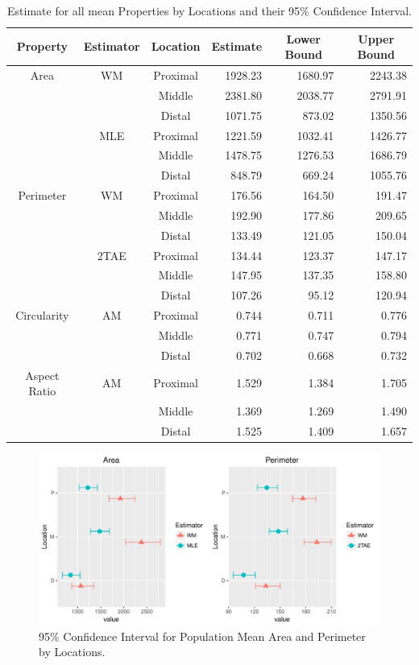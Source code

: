\documentclass{article}\usepackage[]{graphicx}\usepackage[]{color}
\makeatletter
\def\maxwidth{ %
  \ifdim\Gin@nat@width>\linewidth
    \linewidth
  \else
    \Gin@nat@width
  \fi
}
\newenvironment{knitrout}{}{} %
\numberwithin{figure}{subsection} %
\numberwithin{table}{subsection} %
\makeatother
\begin{document}
\begin{table}[!htbp]
\begin{center}
\begin{tabular}{cccrrr}
\hline\hline
\multicolumn{1}{c}{Property}&\multicolumn{1}{c}{Estimator}&\multicolumn{1}{c}{Location}&\multicolumn{1}{c}{Estimate}&\multicolumn{1}{c}{Lower Bound}&\multicolumn{1}{c}{Upper Bound}\tabularnewline
\hline

Area&WM&Proximal&1928.23&1680.97&2243.38\tabularnewline
&&Middle&2381.80&2038.77&2791.91\tabularnewline
&&Distal&1071.75&873.02&1350.56\tabularnewline
&MLE&Proximal&1221.59&1032.41&1426.77\tabularnewline
&&Middle&1478.75&1276.53&1686.79\tabularnewline
&&Distal&848.79&669.24&1055.76\tabularnewline
\hline

Perimeter&WM&Proximal&176.56&164.50&191.47\tabularnewline
&&Middle&192.90&177.86&209.65\tabularnewline
&&Distal&133.49&121.05&150.04\tabularnewline
&2TAE&Proximal&134.44&123.37&147.17\tabularnewline
&&Middle&147.95&137.35&158.80\tabularnewline
&&Distal&107.26&95.12&120.94\tabularnewline
\hline

Circularity&AM&Proximal&0.744&0.711&0.776\tabularnewline
&&Middle&0.771&0.747&0.794\tabularnewline
&&Distal&0.702&0.668&0.732\tabularnewline
\hline

Aspect Ratio&AM&Proximal&1.529&1.384&1.705\tabularnewline
&&Middle&1.369&1.269&1.490\tabularnewline
&&Distal&1.525&1.409&1.657\tabularnewline
\hline
\end{tabular}
\caption{Estimate for all mean Properties by Locations and their 95\% Confidence Interval.\label{tab_est}}\end{center}
\end{table}


\begin{figure}[!htbp]
  \centering
\begin{knitrout}
\color{fgcolor}
\includegraphics[width=\maxwidth]{figure/unnamed-chunk-13-1} 

\end{knitrout}
  \caption{95\% Confidence Interval for Population Mean Area and Perimeter by Locations.}
  \label{m_area_per}
\end{figure}
\vspace{0.5cm}
\end{document}
